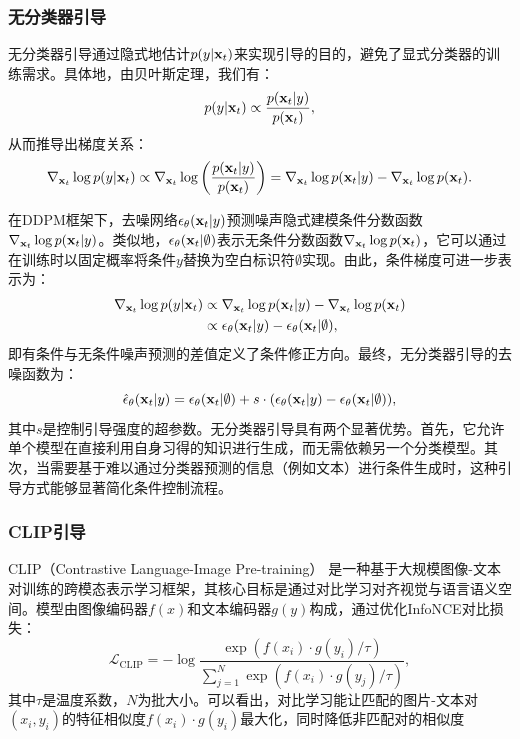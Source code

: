 \documentclass[11pt,a4paper,UTF8]{ctexart}
\begin{document}
\subsubsection{无分类器引导}

无分类器引导\cite{ho2022classifier}通过隐式地估计$p(y|\mathbf{x}_t)$来实现引导的目的，避免了显式分类器的训练需求。具体地，由贝叶斯定理，我们有：
\begin{equation*}
    p(y|\mathbf{x}_t) \propto \frac{p(\mathbf{x}_t|y)}{p(\mathbf{x}_t)},
\end{equation*}
从而推导出梯度关系：
\begin{equation*}
    \nabla_{\mathbf{x}_t}\log p(y|\mathbf{x}_t) \propto \nabla_{\mathbf{x}_t}\log \left(\frac{p(\mathbf{x}_t|y)}{p(\mathbf{x}_t)}\right) = \nabla_{\mathbf{x}_t}\log p(\mathbf{x}_t|y) -\nabla_{\mathbf{x}_t}\log p(\mathbf{x}_t).
\end{equation*}

在DDPM框架下，去噪网络$\epsilon_\theta(\mathbf{x}_t|y)$预测噪声隐式建模条件分数函数$\nabla_{\mathbf{x}_t}\log p(\mathbf{x}_t|y)$。类似地，$\epsilon_\theta(\mathbf{x}_t|\emptyset)$表示无条件分数函数$\nabla_{\mathbf{x}_t}\log p(\mathbf{x}_t)$，它可以通过在训练时以固定概率将条件$y$替换为空白标识符$\emptyset$实现。由此，条件梯度可进一步表示为：
\begin{align*}
    \nabla_{\mathbf{x}_t}\log p(y|\mathbf{x}_t) & \propto \nabla_{\mathbf{x}_t}\log p(\mathbf{x}_t|y) -\nabla_{\mathbf{x}_t}\log p(\mathbf{x}_t) \\
    &\propto \epsilon_\theta(\mathbf{x}_t|y) - \epsilon_\theta(\mathbf{x}_t|\emptyset),
\end{align*}
即有条件与无条件噪声预测的差值定义了条件修正方向。最终，无分类器引导的去噪函数为：
\begin{equation}
    \hat{\epsilon}_\theta(\mathbf{x}_t|y) = \epsilon_\theta(\mathbf{x}_t|\emptyset) + s\cdot(\epsilon_\theta(\mathbf{x}_t|y) - \epsilon_\theta(\mathbf{x}_t|\emptyset)),
\label{conditional_classifier_free_guided}
\end{equation}
其中$s$是控制引导强度的超参数。无分类器引导具有两个显著优势。首先，它允许单个模型在直接利用自身习得的知识进行生成，而无需依赖另一个分类模型。其次，当需要基于难以通过分类器预测的信息（例如文本）进行条件生成时，这种引导方式能够显著简化条件控制流程。

\subsubsection{CLIP引导}

CLIP（Contrastive Language-Image Pre-training）\cite{radford2021learning} 是一种基于大规模图像-文本对训练的跨模态表示学习框架，其核心目标是通过对比学习对齐视觉与语言语义空间。模型由图像编码器$f(x)$和文本编码器$g(y)$构成，通过优化InfoNCE对比损失\cite{oord2018representation}：
\begin{equation*}
\mathcal{L}_{\text{CLIP}} = -\log \frac{\exp(f(x_i)\cdot g(y_i)/\tau)}{\sum_{j=1}^N \exp(f(x_i)\cdot g(y_j)/\tau)},
\end{equation*}
其中$\tau$是温度系数，$N$为批大小。可以看出，对比学习能让匹配的图片-文本对$(x_i,y_i)$的特征相似度$f(x_i)\cdot g(y_i)$最大化，同时降低非匹配对的相似度
\end{document}
